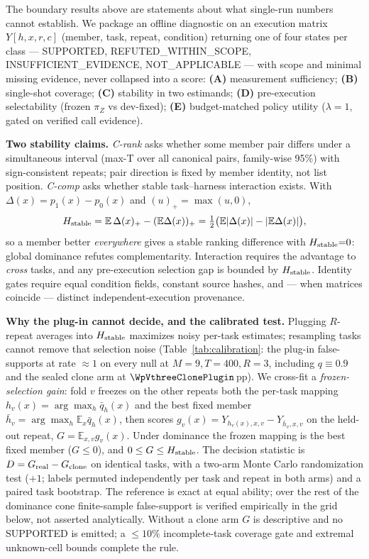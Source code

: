 The boundary results above are statements about what single-run numbers
cannot establish. We package an offline diagnostic on an execution matrix
$Y[h,x,r,c]$ (member, task, repeat, condition) returning one of four
states per class --- SUPPORTED, REFUTED\_WITHIN\_SCOPE,
INSUFFICIENT\_EVIDENCE, NOT\_APPLICABLE --- with scope and minimal
missing evidence, never collapsed into a score: \textbf{(A)} measurement
sufficiency; \textbf{(B)} single-shot coverage; \textbf{(C)} stability
in two estimands; \textbf{(D)} pre-execution selectability (frozen
$\pi_Z$ vs dev-fixed); \textbf{(E)} budget-matched policy utility
($\lambda{=}1$, gated on verified call evidence).

\textbf{Two stability claims.} \emph{C-rank} asks whether some member
pair differs under a simultaneous interval (max-T over all canonical
pairs, family-wise 95\%) with sign-consistent repeats; pair direction is
fixed by member identity, not list position. \emph{C-comp} asks whether
stable task--harness interaction exists. With
$\Delta(x)=p_1(x)-p_0(x)$ and $(u)_+=\max(u,0)$,
\begin{equation}
H_{\rm stable}=\mathbb{E}\,\Delta(x)_+-(\mathbb{E}\Delta(x))_+
=\tfrac12\bigl(\mathbb{E}|\Delta(x)|-|\mathbb{E}\Delta(x)|\bigr),
\label{eq:identity}
\end{equation}
so a member better \emph{everywhere} gives a stable ranking difference
with $H_{\rm stable}{=}0$: global dominance refutes complementarity.
Interaction requires the advantage to \emph{cross} tasks, and any
pre-execution selection gap is bounded by $H_{\rm stable}$. Identity
gates require equal condition fields, constant source hashes, and ---
when matrices coincide --- distinct independent-execution provenance.

\textbf{Why the plug-in cannot decide, and the calibrated test.}
Plugging $R$-repeat averages into $H_{\rm stable}$ maximizes noisy
per-task estimates; resampling tasks cannot remove that selection noise
(Table~\ref{tab:calibration}: the plug-in false-supports at rate
$\approx1$ on every null at $M{=}9,T{=}400,R{=}3$, including $q\equiv0.9$
and the sealed clone arm at $\WpVthreeClonePlugin$\,pp). We cross-fit a
\emph{frozen-selection gain}: fold $v$ freezes on the other repeats both
the per-task mapping $h_v(x)=\arg\max_h\bar q_h(x)$ and the best fixed
member $\bar h_v=\arg\max_h\mathbb E_x\bar q_h(x)$, then scores
$g_v(x)=Y_{h_v(x),x,v}-Y_{\bar h_v,x,v}$ on the held-out repeat,
$G=\mathbb E_{x,v}g_v(x)$.\label{sec:calibration-test}
Under dominance the frozen mapping is the best fixed member ($G\le0$),
and $0\le G\le H_{\rm stable}$. The decision statistic is
$D=G_{\rm real}-G_{\rm clone}$ on identical tasks, with a two-arm
Monte Carlo randomization test ($+1$; labels permuted independently
per task and repeat in both arms) and a paired task bootstrap. The
reference is exact at equal ability; over the rest of the dominance
cone finite-sample false-support is verified empirically in the grid
below, not asserted analytically. Without a clone arm $G$ is
descriptive and no SUPPORTED is emitted; a $\le10\%$ incomplete-task
coverage gate and extremal unknown-cell bounds complete the rule.

